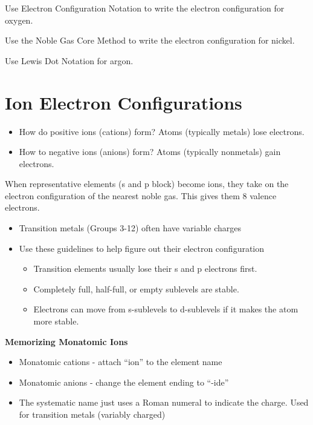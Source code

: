 \documentclass[../hchem.tex]{subfiles}
\begin{document}
\ex Use Electron Configuration Notation to write the electron configuration for oxygen.

\ex Use the Noble Gas Core Method to write the electron configuration for nickel.

\ex Use Lewis Dot Notation for argon.

\section{Ion Electron Configurations}
\begin{itemize}
    \item How do positive ions (cations) form?
    Atoms (typically metals) lose electrons.

    \item How to negative ions (anions) form?
    Atoms (typically nonmetals) gain electrons. 
\end{itemize}

When representative elements (s and p block) become ions, they take on the electron 
configuration of the nearest noble gas. This gives them 8 valence electrons.

\begin{itemize}
    \item Transition metals (Groups 3-12) often have variable charges 
    \item Use these guidelines to help figure out their electron configuration
    \begin{itemize}
        \item Transition elements usually lose their s and p electrons first. 
        \item Completely full, half-full, or empty sublevels are stable.
        \item Electrons can move from s-sublevels to d-sublevels if it makes the atom more stable.
    \end{itemize}
\end{itemize}


\textbf{Memorizing Monatomic Ions}
\begin{itemize}
    \item Monatomic cations - attach ``ion'' to the element name 
    \item Monatomic anions - change the element ending to ``-ide''
    \item The systematic name just uses a Roman numeral to indicate the charge. Used for transition metals (variably charged)
\end{itemize}
\end{document}
